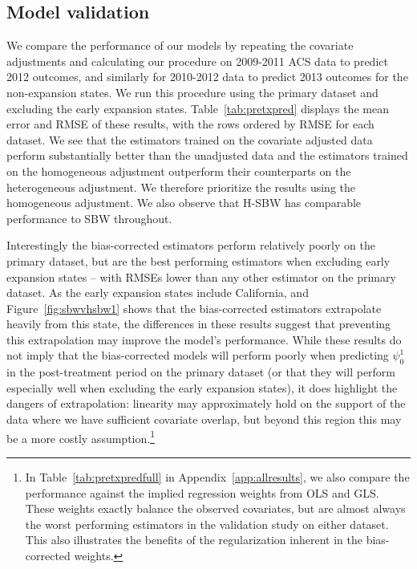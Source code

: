 \documentclass[aoas]{imsart}
\theoremstyle{plain}
\theoremstyle{remark}
\begin{document}
\subsection{Model validation}\label{sec:validation}

We compare the performance of our models by repeating the covariate adjustments and calculating our procedure on 2009-2011 ACS data to predict 2012 outcomes, and similarly for 2010-2012 data to predict 2013 outcomes for the non-expansion states. We run this procedure using the primary dataset and excluding the early expansion states. Table~\ref{tab:pretxpred} displays the mean error and RMSE of these results, with the rows ordered by RMSE for each dataset. We see that the estimators trained on the covariate adjusted data perform substantially better than the unadjusted data and the estimators trained on the homogeneous adjustment outperform their counterparts on the heterogeneous adjustment. We therefore prioritize the results using the homogeneous adjustment. We also observe that H-SBW has comparable performance to SBW throughout.

Interestingly the bias-corrected estimators perform relatively poorly on the primary dataset, but are the best performing estimators when excluding early expansion states -- with RMSEs lower than any other estimator on the primary dataset. As the early expansion states include California, and Figure~\ref{fig:sbwvhsbw1} shows that the bias-corrected estimators extrapolate heavily from this state, the differences in these results suggest that preventing this extrapolation may improve the model's performance. While these results do not imply that the bias-corrected models will perform poorly when predicting $\psi^1_0$ in the post-treatment period on the primary dataset (or that they will perform especially well when excluding the early expansion states), it does highlight the dangers of extrapolation: linearity may approximately hold on the support of the data where we have sufficient covariate overlap, but beyond this region this may be a more costly assumption.\footnote{In Table~\ref{tab:pretxpredfull} in Appendix~\ref{app:allresults}, we also compare the performance against the implied regression weights from OLS and GLS. These weights exactly balance the observed covariates, but are almost always the worst performing estimators in the validation study on either dataset. This also illustrates the benefits of the regularization inherent in the bias-corrected weights.}
\end{document}
